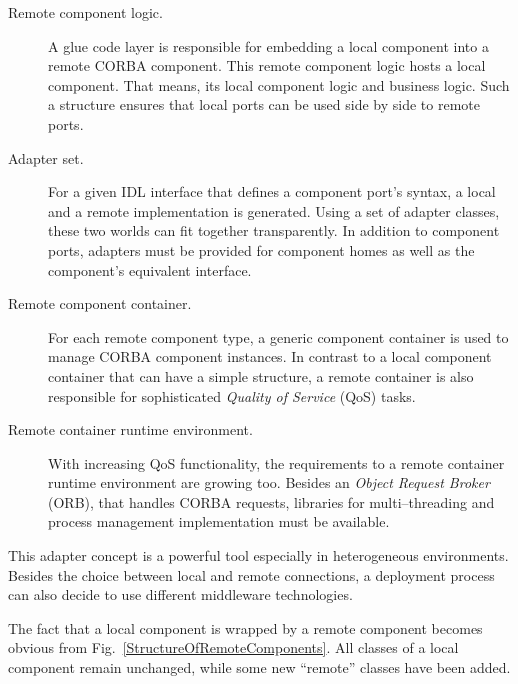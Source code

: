 \begin{description}
\item [Remote component logic.]
A glue code layer is responsible for embedding a local component into a 
remote CORBA component. 
This remote component logic hosts a local component.
That means, its local component logic and business logic.  
Such a structure ensures that local ports can be used side by side to remote
ports.

\item [Adapter set.]
For a given IDL interface that defines a component port's syntax, a local and 
a remote implementation is generated. 
Using a set of adapter classes, these two worlds can fit together transparently.
In addition to component ports, adapters must be provided for component homes
as well as the component's equivalent interface.

\item [Remote component container.]
For each remote component type, a generic component container is used to
manage CORBA component instances.
In contrast to a local component container that can have a simple structure, a
remote container is also responsible for sophisticated {\it Quality of Service} 
(QoS) tasks.

\item [Remote container runtime environment.]
With increasing QoS functionality, the requirements to a remote container
runtime environment are growing too.
Besides an {\it Object Request Broker} (ORB), that handles CORBA requests,
libraries for multi--threading and process management implementation must 
be available.  
\end{description}

\noindent
This adapter concept is a powerful tool especially in heterogeneous 
environments. Besides the choice between local and remote connections, 
a deployment process can also decide to use different middleware technologies.


The fact that a local component is wrapped by a remote component becomes 
obvious from Fig.~\ref{StructureOfRemoteComponents}. All classes of a local
component remain unchanged, while some new ``remote'' classes have been added.

